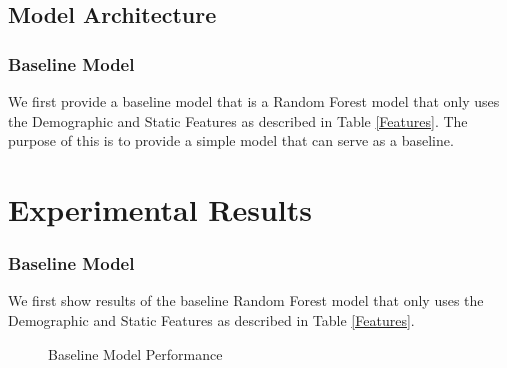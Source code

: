 \documentclass[12pt, final]{article}
\begin{document}
\subsection{Model Architecture}
\label{Model Architecture}

\subsubsection{Baseline Model}
We first provide a baseline model that is a Random Forest model that only uses the Demographic and Static Features as described in Table \ref{Features}. The purpose of this is to provide a simple model that can serve as a baseline.

\section{Experimental Results}
\label{Experimental Results}

\subsubsection{Baseline Model}
We first show results of the baseline Random Forest model that only uses the Demographic and Static Features as described in Table \ref{Features}.

\begin{figure}[H]
\centering     %
{}
\caption{Baseline Model Performance}
\label{BaselineModelPerformance}
\end{figure}
\end{document}
